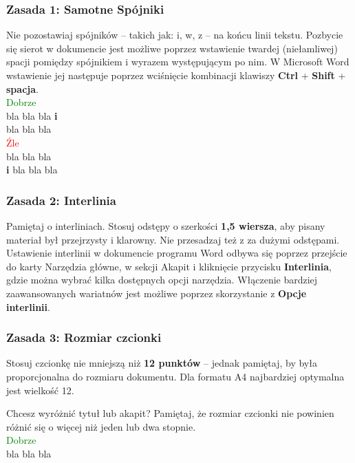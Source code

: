 \documentclass[11pt,polish]{article}
\begin{document}
\subsubsection{Zasada 1: Samotne Spójniki}
  Nie pozostawiaj spójników – takich jak: i, w, z – na końcu linii tekstu. Pozbycie się sierot w dokumencie jest możliwe poprzez wstawienie twardej (niełamliwej) spacji pomiędzy spójnikiem i wyrazem występującym po nim. W Microsoft Word wstawienie jej następuje poprzez wciśnięcie kombinacji klawiszy \textbf{Ctrl} + \textbf{Shift} + \textbf{spacja}. 
\\

  \textcolor{green}{Dobrze} \\
  \indent bla bla bla \textbf{i} \\ 
  \indent bla bla bla \\

  \textcolor{red}{Źle} \\
  \indent bla bla bla \\
  \indent \textbf{i} bla bla bla

\subsubsection{Zasada 2: Interlinia}
  Pamiętaj o interliniach. Stosuj odstępy o szerkości \textbf{1,5 wiersza}, aby pisany materiał był przejrzysty i klarowny. Nie przesadzaj też z za dużymi odstępami. Ustawienie interlinii w dokumencie programu Word odbywa się poprzez przejście do karty Narzędzia główne, w sekcji Akapit i kliknięcie przycisku \textbf{Interlinia}, gdzie można wybrać kilka dostępnych opcji narzędzia. Włączenie bardziej zaawansowanych wariatnów jest możliwe poprzez skorzystanie z \textbf{Opcje interlinii}.

\newpage
\subsubsection{Zasada 3: Rozmiar czcionki}
  Stosuj czcionkę nie mniejszą niż \textbf{12 punktów} – jednak pamiętaj, by była proporcjonalna do rozmiaru dokumentu. Dla formatu A4 najbardziej optymalna jest wielkość 12.

  Chcesz wyróżnić tytuł lub akapit? Pamiętaj, że rozmiar czcionki nie powinien różnić się o więcej niż jeden lub dwa stopnie.
  \\

  \textcolor{green}{Dobrze} \\
  \indent bla bla bla \\ 
\end{document}
